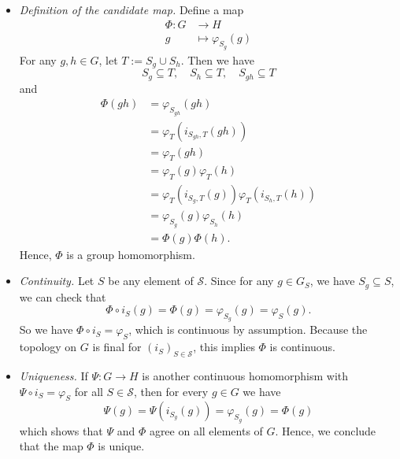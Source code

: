 \documentclass{report}
\begin{document}
\begin{prf}
\begin{itemize}
	\item \emph{Definition of the candidate map.}
	Define a map
	\begin{align*}
		\Phi\colon G &\longrightarrow H \\
		g &\longmapsto \varphi_{S_g}(g)
	\end{align*}
	For any $g,h\in G$, let $T:= S_{g} \cup S_{h}$. Then we have 
	\[
	S_g\subseteq T,\quad S_h\subseteq T,\quad S_{gh}\subseteq T
	\]
	and
	\begin{align*}
		\Phi(gh)&=\varphi_{S_{gh}}(gh)\\
		&=\varphi_T(i_{S_{gh},T}(gh))\\
		&=\varphi_T(gh)\\
		&=\varphi_T(g)\varphi_T(h)\\
		&=\varphi_T\left(i_{S_g,T}(g)\right)\varphi_T\left(i_{S_h,T}(h)\right)\\
		&=\varphi_{S_g}(g)\varphi_{S_h}(h)\\
		&=\Phi(g)\Phi(h).
	\end{align*}
	Hence, $\Phi$ is a group homomorphism. 
	\item \emph{Continuity.}
	Let $S$ be any element of $\mathcal{S}$. Since for any $g\in G_{S}$, we have $S_g\subseteq S$, we can check that
	\[
	\Phi\circ i_S(g)=\Phi(g)=\varphi_{S_g}(g)=\varphi_S(g).
	\]
	So we have $\Phi\circ i_S=\varphi_S$, which is continuous by assumption. Because the topology on $G$ is final for $(i_S)_{S\in \mathcal{S}}$, this implies
	$\Phi$ is continuous.
	\item \emph{Uniqueness.}
	If $\Psi\colon G\to H$ is another continuous homomorphism with
	$\Psi\circ i_S=\varphi_S$ for all $S\in\mathcal{S}$, then for every $g\in G$ we have
	\[
	\Psi(g)=\Psi(i_{S_g}(g))=\varphi_{S_g}(g)=\Phi(g)
	\]
	which shows that $\Psi$ and $\Phi$ agree on all elements of $G$. Hence, we conclude that the map $\Phi$ is unique.
\end{itemize}

\end{prf}
\end{document}
